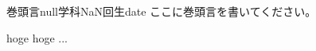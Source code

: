 \documentclass[10pt,b5paper,papersize,dvipdfmx]{jsbook}
\begin{document}
\begin{preface}{巻頭言}{null学科NaN回生}{}{date}
  ここに巻頭言を書いてください。\par
  hoge hoge ...
\end{preface}
\end{document}
